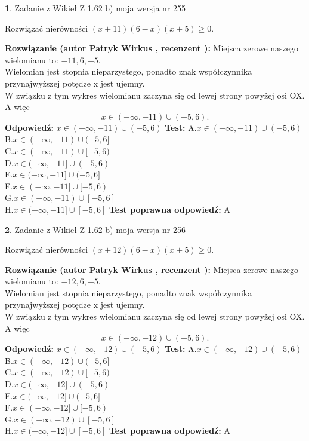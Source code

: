 \documentclass[12pt, a4paper]{article}
\theoremstyle{definition} %
\newtheorem{zad}{}
\newcommand{\zadStart}[1]{\begin{zad}#1\newline}
\newcommand{\zadStop}{\end{zad}}
\newcommand{\rozwStart}[2]{\noindent \textbf{Rozwiązanie (autor #1 , recenzent #2): }\newline}
\newcommand{\rozwStop}{\newline}
\newcommand{\odpStart}{\noindent \textbf{Odpowiedź:}\newline}
\newcommand{\odpStop}{\newline}
\newcommand{\testStart}{\noindent \textbf{Test:}\newline}
\newcommand{\testStop}{\newline}
\newcommand{\kluczStart}{\noindent \textbf{Test poprawna odpowiedź:}\newline}
\newcommand{\kluczStop}{\newline}
\begin{document}
\zadStart{Zadanie z Wikieł Z 1.62 b) moja wersja nr 255}

Rozwiązać nierówności $(x+11)(6-x)(x+5)\ge0$.
\zadStop
\rozwStart{Patryk Wirkus}{}
Miejsca zerowe naszego wielomianu to: $-11, 6, -5$.\\
Wielomian jest stopnia nieparzystego, ponadto znak współczynnika przy\linebreak najwyższej potędze x jest ujemny.\\ W związku z tym wykres wielomianu zaczyna się od lewej strony powyżej osi OX. A więc $$x \in (-\infty,-11) \cup (-5,6).$$
\rozwStop
\odpStart
$x \in (-\infty,-11) \cup (-5,6)$
\odpStop
\testStart
A.$x \in (-\infty,-11) \cup (-5,6)$\\
B.$x \in (-\infty,-11) \cup (-5,6]$\\
C.$x \in (-\infty,-11) \cup [-5,6)$\\
D.$x \in (-\infty,-11] \cup (-5,6)$\\
E.$x \in (-\infty,-11] \cup (-5,6]$\\
F.$x \in (-\infty,-11] \cup [-5,6)$\\
G.$x \in (-\infty,-11) \cup [-5,6]$\\
H.$x \in (-\infty,-11] \cup [-5,6]$
\testStop
\kluczStart
A
\kluczStop



\zadStart{Zadanie z Wikieł Z 1.62 b) moja wersja nr 256}

Rozwiązać nierówności $(x+12)(6-x)(x+5)\ge0$.
\zadStop
\rozwStart{Patryk Wirkus}{}
Miejsca zerowe naszego wielomianu to: $-12, 6, -5$.\\
Wielomian jest stopnia nieparzystego, ponadto znak współczynnika przy\linebreak najwyższej potędze x jest ujemny.\\ W związku z tym wykres wielomianu zaczyna się od lewej strony powyżej osi OX. A więc $$x \in (-\infty,-12) \cup (-5,6).$$
\rozwStop
\odpStart
$x \in (-\infty,-12) \cup (-5,6)$
\odpStop
\testStart
A.$x \in (-\infty,-12) \cup (-5,6)$\\
B.$x \in (-\infty,-12) \cup (-5,6]$\\
C.$x \in (-\infty,-12) \cup [-5,6)$\\
D.$x \in (-\infty,-12] \cup (-5,6)$\\
E.$x \in (-\infty,-12] \cup (-5,6]$\\
F.$x \in (-\infty,-12] \cup [-5,6)$\\
G.$x \in (-\infty,-12) \cup [-5,6]$\\
H.$x \in (-\infty,-12] \cup [-5,6]$
\testStop
\kluczStart
A
\kluczStop
\end{document}
